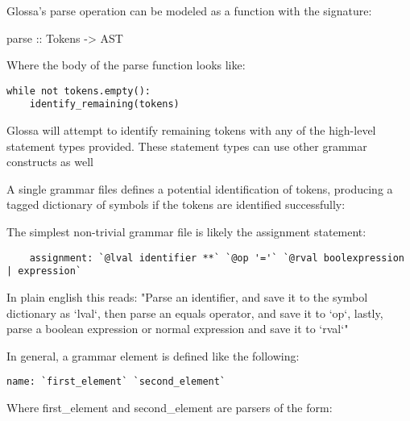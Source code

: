 \documentclass{article}
\begin{document}
Glossa's parse operation can be modeled as a function with the signature:

parse :: Tokens -> AST

Where the body of the parse function looks like:

\lstset{language=Python}
\begin{lstlisting}
while not tokens.empty():
    identify_remaining(tokens)
\end{lstlisting}

Glossa will attempt to identify remaining tokens with any of the high-level statement types provided.
These statement types can use other grammar constructs as well

A single grammar files defines a potential identification of tokens, producing a tagged dictionary of symbols if the tokens are identified successfully:

The simplest non-trivial grammar file is likely the assignment statement:
\begin{lstlisting}
    assignment: `@lval identifier **` `@op '='` `@rval boolexpression | expression`
\end{lstlisting}

In plain english this reads:
"Parse an identifier, and save it to the symbol dictionary as `lval`, then parse an equals operator, and save it to `op`, lastly, parse a boolean expression or normal expression and save it to `rval`"

In general, a grammar element is defined like the following:

\begin{lstlisting}
name: `first_element` `second_element`
\end{lstlisting}

Where first\_element and second\_element are parsers of the form:
\end{document}
